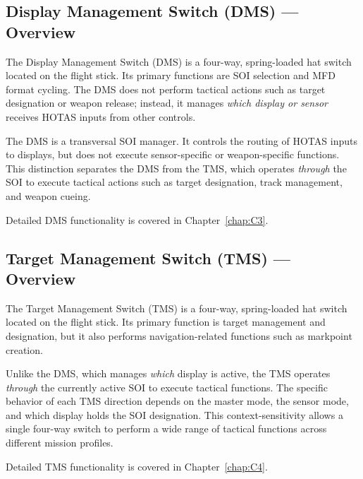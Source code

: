 \documentclass[11pt, a4paper, twoside]{report}
\begin{document}
\subsection{Display Management Switch (DMS) — Overview}
\label{sec:C2-S3-S1}

The Display Management Switch (DMS) is a four-way, spring-loaded hat switch located on the flight stick. Its primary functions are SOI selection and MFD format cycling. The DMS does not perform tactical actions such as target designation or weapon release; instead, it manages \textit{which display or sensor} receives HOTAS inputs from other controls.

The DMS is a transversal SOI manager. It controls the routing of HOTAS inputs to displays, but does not execute sensor-specific or weapon-specific functions. This distinction separates the DMS from the TMS, which operates \textit{through} the SOI to execute tactical actions such as target designation, track management, and weapon cueing.

Detailed DMS functionality is covered in Chapter~\ref{chap:C3}.

\subsection{Target Management Switch (TMS) — Overview}
\label{sec:C2-S3-S2}

The Target Management Switch (TMS) is a four-way, spring-loaded hat switch located on the flight stick. Its primary function is target management and designation, but it also performs navigation-related functions such as markpoint creation.

Unlike the DMS, which manages \textit{which} display is active, the TMS operates \textit{through} the currently active SOI to execute tactical functions. The specific behavior of each TMS direction depends on the master mode, the sensor mode, and which display holds the SOI designation. This context-sensitivity allows a single four-way switch to perform a wide range of tactical functions across different mission profiles.

Detailed TMS functionality is covered in Chapter~\ref{chap:C4}.
\end{document}

